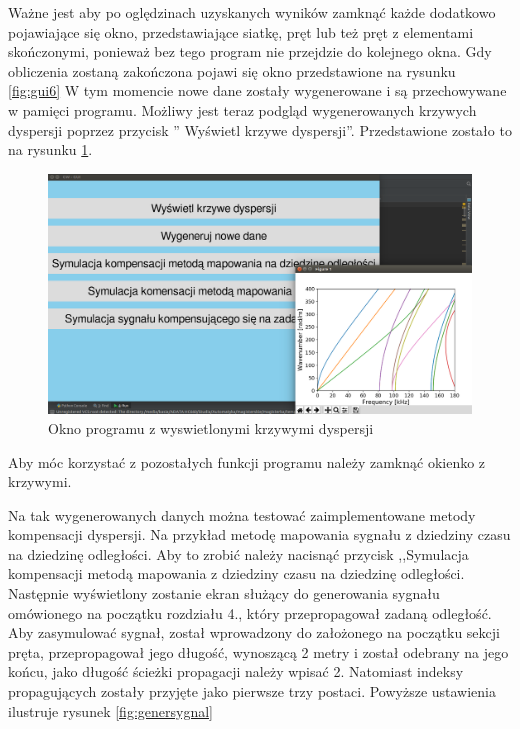 Ważne jest aby po oględzinach uzyskanych wyników zamknąć każde dodatkowo pojawiające się okno, przedstawiające siatkę, pręt lub też pręt z elementami skończonymi, ponieważ bez tego program nie przejdzie do kolejnego okna. Gdy obliczenia zostaną zakończona pojawi się okno przedstawione na rysunku \ref{fig:gui6} W tym momencie nowe dane zostały wygenerowane i są przechowywane w pamięci programu. Możliwy jest teraz podgląd wygenerowanych krzywych dyspersji poprzez przycisk '' Wyświetl krzywe dyspersji''. Przedstawione zostało to na rysunku \ref{fig:krzywesa}.

\begin{figure}[h]
\centering
\includegraphics[width=13cm]{Zdjecia/5/kasia/krzywesa}
\caption{Okno programu z wyswietlonymi krzywymi dyspersji}
\label{fig:krzywesa}
\end{figure}

Aby móc korzystać z pozostałych funkcji programu należy zamknąć okienko z krzywymi.

Na tak wygenerowanych danych można testować zaimplementowane metody kompensacji dyspersji. Na przykład metodę mapowania sygnału z dziedziny czasu na dziedzinę odległości. Aby to zrobić należy nacisnąć przycisk ,,Symulacja kompensacji metodą mapowania z dziedziny czasu na dziedzinę odległości. Następnie wyświetlony zostanie ekran służący do generowania sygnału omówionego na początku rozdziału 4., który przepropagował zadaną odległość. Aby zasymulować sygnał, został wprowadzony do założonego na początku sekcji pręta, przepropagował jego długość, wynoszącą 2 metry i został odebrany na jego końcu, jako długość ścieżki propagacji należy wpisać 2. Natomiast indeksy propagujących zostały przyjęte jako pierwsze trzy postaci. Powyższe ustawienia ilustruje rysunek \ref{fig:genersygnal}

